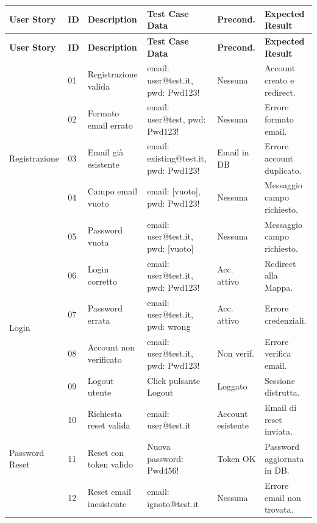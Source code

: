 \documentclass[12pt,a4paper]{article}
\begin{document}
\small
\begin{longtable}{|p{2.2cm}|p{0.6cm}|p{3.2cm}|p{2.8cm}|p{1.8cm}|p{3.2cm}|}
\hline
\textbf{User Story} & \textbf{ID} & \textbf{Description} & \textbf{Test Case Data} & \textbf{Precond.} & \textbf{Expected Result} \\ \hline
\endfirsthead
\hline
\textbf{User Story} & \textbf{ID} & \textbf{Description} & \textbf{Test Case Data} & \textbf{Precond.} & \textbf{Expected Result} \\ \hline
\endhead

\multirow{5}{=}{Registrazione} & 01 & Registrazione valida & email: user@test.it, pwd: Pwd123! & Nessuna & Account creato e redirect. \\ \cline{2-6}
 & 02 & Formato email errato & email: user@test, pwd: Pwd123! & Nessuna & Errore formato email. \\ \cline{2-6}
 & 03 & Email già esistente & email: existing@test.it, pwd: Pwd123! & Email in DB & Errore account duplicato. \\ \cline{2-6}
 & 04 & Campo email vuoto & email: [vuoto], pwd: Pwd123! & Nessuna & Messaggio campo richiesto. \\ \cline{2-6}
 & 05 & Password vuota & email: user@test.it, pwd: [vuoto] & Nessuna & Messaggio campo richiesto. \\ \hline

\multirow{4}{=}{Login} & 06 & Login corretto & email: user@test.it, pwd: Pwd123! & Acc. attivo & Redirect alla Mappa. \\ \cline{2-6}
 & 07 & Password errata & email: user@test.it, pwd: wrong & Acc. attivo & Errore credenziali. \\ \cline{2-6}
 & 08 & Account non verificato & email: user@test.it, pwd: Pwd123! & Non verif. & Errore verifica email. \\ \cline{2-6}
 & 09 & Logout utente & Click pulsante Logout & Loggato & Sessione distrutta. \\ \hline

\multirow{3}{=}{Password Reset} & 10 & Richiesta reset valida & email: user@test.it & Account esistente & Email di reset inviata. \\ \cline{2-6}
 & 11 & Reset con token valido & Nuova password: Pwd456! & Token OK & Password aggiornata in DB. \\ \cline{2-6}
 & 12 & Reset email inesistente & email: ignoto@test.it & Nessuna & Errore email non trovata. \\ \hline


\end{longtable}
\end{document}
